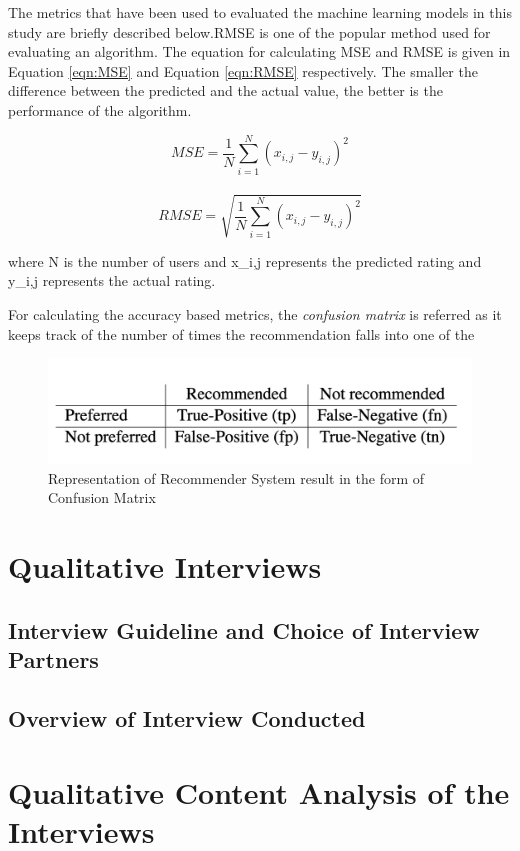 The metrics that have been used to evaluated the machine learning models in this study are briefly described below.RMSE is one of the popular method used for evaluating an algorithm. The equation for calculating MSE and RMSE is given in Equation \ref{eqn:MSE} and Equation \ref{eqn:RMSE} respectively. The smaller the difference between the predicted and the actual value, the better is the performance of the algorithm. 

\begin{equation}
\label{eqn:MSE}MSE =  \frac{1}{N}\sum_{i=1}^{N} (x_{i,j}-y_{i,j})^2
\end{equation}
\\
\begin{equation}
\label{eqn:RMSE}RMSE = \sqrt{ \frac{1}{N}\sum_{i=1}^{N} (x_{i,j}-y_{i,j})^2}
\end{equation}

where N is the number of users and x{\_i,j} represents the predicted rating and y{\_i,j} represents the actual rating. \\ \par

For calculating the accuracy based metrics, the \textit{confusion matrix} is referred as it keeps track of the number of times the recommendation falls into one of the 







\begin{figure}
    \centering
    \includegraphics[scale=0.5]{chapters/figures/confusion_matrix.png}
    \caption{Representation of Recommender System result in the form of Confusion Matrix \autocite[2945]{gunawardana2009survey}}
    \label{fig:confusion_matrix}
\end{figure}


\section{Qualitative Interviews}

\subsection{Interview Guideline and Choice of Interview Partners}
\subsection{Overview of Interview Conducted}
\section{Qualitative Content Analysis of the Interviews}

